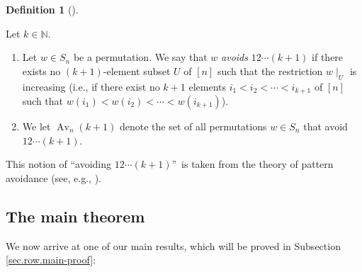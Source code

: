 \documentclass[numbers=enddot,12pt,final,onecolumn,notitlepage]{scrartcl}%
\numberwithin{exer}{subsection}
\theoremstyle{definition}
\newtheorem{defi}[theo]{Definition}
\newenvironment{definition}[1][]
{\begin{defi}[#1]\begin{leftbar}}
{\end{leftbar}\end{defi}}
\begin{document}
\begin{definition}
\label{def.avoid.up}Let $k\in\mathbb{N}$.

\begin{enumerate}
\item[\textbf{(a)}] Let $w\in S_{n}$ be a permutation. We say that $w$
\emph{avoids }$12\cdots\left(  k+1\right)  $ if there exists no $\left(
k+1\right)  $-element subset $U$ of $\left[  n\right]  $ such that the
restriction $w\mid_{U}$ is increasing (i.e., if there exist no $k+1$ elements
$i_{1}<i_{2}<\cdots<i_{k+1}$ of $\left[  n\right]  $ such that $w\left(
i_{1}\right)  <w\left(  i_{2}\right)  <\cdots<w\left(  i_{k+1}\right)  $).

\item[\textbf{(b)}] We let $\operatorname*{Av}\nolimits_{n}\left(  k+1\right)
$ denote the set of all permutations $w\in S_{n}$ that avoid $12\cdots\left(
k+1\right)  $.
\end{enumerate}
\end{definition}

This notion of \textquotedblleft avoiding $12\cdots\left(  k+1\right)
$\textquotedblright\ is taken from the theory of pattern avoidance (see, e.g.,
\cite[Chapters 4--5]{Bona22}).

\subsection{The main theorem}

We now arrive at one of our main results, which will be proved in Subsection
\ref{sec.row.main-proof}:
\end{document}
